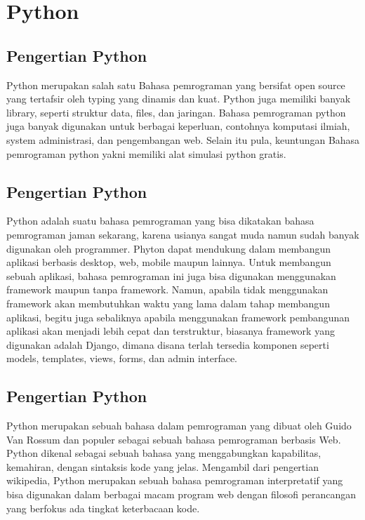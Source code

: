 \documentclass[12pt,a4paper]{article}
\begin{document}


\section{Python}
\subsection{Pengertian Python}
Python merupakan salah satu Bahasa pemrograman yang bersifat open source yang tertafsir oleh typing yang dinamis dan kuat. Python juga memiliki banyak library, seperti struktur data, files, dan jaringan. Bahasa pemrograman python juga banyak digunakan untuk berbagai keperluan, contohnya komputasi ilmiah, system administrasi, dan pengembangan web. Selain itu pula, keuntungan Bahasa pemrograman python yakni memiliki alat simulasi python gratis.
\subsection{Pengertian Python}
Python adalah suatu bahasa pemrograman yang bisa dikatakan bahasa pemrograman jaman sekarang, karena usianya sangat muda namun sudah banyak digunakan oleh programmer. Phyton dapat mendukung dalam membangun aplikasi berbasis desktop, web, mobile maupun lainnya. Untuk membangun sebuah aplikasi, bahasa pemrograman ini juga bisa digunakan menggunakan framework maupun tanpa framework. Namun, apabila tidak menggunakan framework akan membutuhkan waktu yang lama dalam tahap membangun aplikasi, begitu juga sebaliknya apabila menggunakan framework pembangunan aplikasi akan menjadi lebih cepat dan terstruktur, biasanya framework yang digunakan adalah Django, dimana disana terlah tersedia komponen seperti models, templates, views, forms, dan admin interface.
\subsection{Pengertian Python}
Python merupakan sebuah bahasa dalam pemrograman yang dibuat oleh Guido Van Rossum dan populer sebagai sebuah bahasa pemrograman berbasis Web. Python dikenal sebagai sebuah bahasa yang menggabungkan kapabilitas, kemahiran, dengan sintaksis kode yang jelas. Mengambil dari pengertian wikipedia, Python merupakan sebuah bahasa pemrograman interpretatif yang bisa digunakan dalam berbagai macam program web dengan filosofi perancangan yang berfokus ada tingkat keterbacaan kode.
\end{document}
